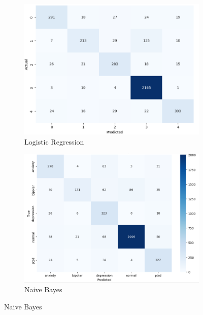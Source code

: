 \begin{figure}[h!]
    \centering
    \begin{subfigure}[b]{0.49\textwidth}
        \centering
        \includegraphics[width=\textwidth]{Images/LR Confusion Matrix.png}
        \caption*{Logistic Regression}
        \label{LRCM}  %
    \end{subfigure}
    \vspace{1cm}
    \hfill
    \begin{subfigure}[b]{0.49\textwidth}
        \centering
        \includegraphics[width=\textwidth]{Images/NB Confusion Matrix.png}
        \caption*{Naive Bayes}
        \label{NBCM}  %
    \end{subfigure}

\end{figure}

